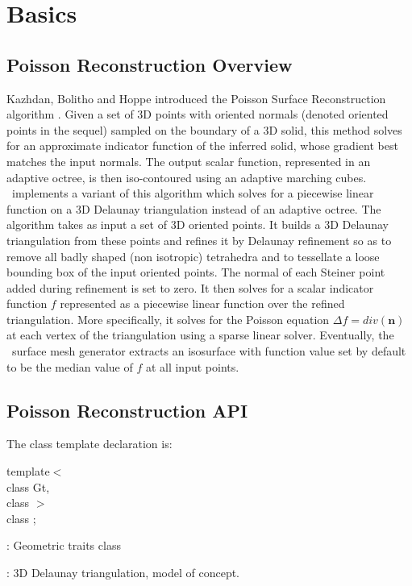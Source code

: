 \section{Basics}


\subsection{Poisson Reconstruction Overview}

Kazhdan, Bolitho and Hoppe introduced the Poisson Surface Reconstruction algorithm \cite{Kazhdan06}.
Given a set of 3D points with oriented normals (denoted oriented points in the sequel)
sampled on the boundary of a 3D solid, this method solves for an approximate indicator function of the inferred solid,
whose gradient best matches the input normals. The output scalar function, represented in an adaptive octree,
is then iso-contoured using an adaptive marching cubes.\\

\cgal\ implements a variant of this algorithm which solves for a piecewise linear function
on a 3D Delaunay triangulation instead of an adaptive octree.
The algorithm takes as input a set of 3D oriented points.
It builds a 3D Delaunay triangulation from these points and refines it by Delaunay refinement
so as to remove all badly shaped (non isotropic) tetrahedra and to tessellate a loose bounding box
of the input oriented points. The normal of each Steiner point added during refinement is set to zero.
It then solves for a scalar indicator function $f$ represented as a piecewise linear function over the refined triangulation.
More specifically, it solves for the Poisson equation  $\Delta f = div(\mathbf{n})$ at each vertex of the triangulation
using a sparse linear solver.
Eventually, the \cgal\ surface mesh generator extracts an isosurface with function value set by default
to be the median value of $f$ at all input points.

\subsection{Poisson Reconstruction API}

The class template declaration is:

template$<$  \\
class Gt,   \\
class $>$   \\
class ;
\ccGlue
{}
\begin{description}
\item {}: Geometric traits class \item {}: 3D Delaunay triangulation, model of  concept. \end{description}

